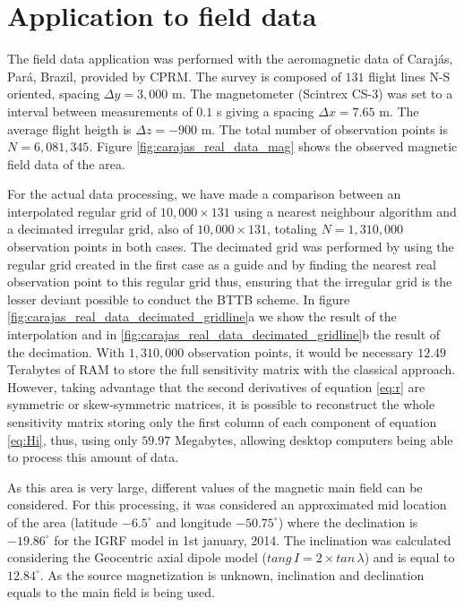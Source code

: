 \section{Application to field data}

The field data application was performed with the aeromagnetic data of Carajás, Pará, Brazil, provided by CPRM.
The survey is composed of $131$ flight lines N-S oriented, spacing $\Delta y = 3,000$ m. The magnetometer (Scintrex CS-3) was set to a interval between measurements of $0.1$ s giving a spacing $\Delta x = 7.65$ m. The average flight heigth is $\Delta z = -900$ m. The total number of observation points is $N = 6,081,345$. Figure \ref{fig:carajas_real_data_mag} shows the observed magnetic field data of the area.

For the actual data processing, we have made a comparison between an interpolated regular grid of $10,000 \times 131$ using a nearest neighbour algorithm and a decimated irregular grid, also of $10,000 \times 131$, totaling $N = 1,310,000$ observation points in both cases. The decimated grid was performed by using the regular grid created in the first case as a guide and by finding the nearest real observation point to this regular grid thus, ensuring that the irregular grid is the lesser deviant possible to conduct the BTTB scheme. In figure \ref{fig:carajas_real_data_decimated_gridline}a we show the result of the interpolation and in \ref{fig:carajas_real_data_decimated_gridline}b the result of the decimation. With $1,310,000$ observation points, it would be necessary $12.49$ Terabytes of RAM to store the full sensitivity matrix with the classical approach. However, taking advantage that the second derivatives of equation \ref{eq:r} are symmetric or skew-symmetric matrices, it is possible to reconstruct the whole sensitivity matrix storing only the first column of each component of equation \ref{eq:Hi}, thus, using only $59.97$ Megabytes, allowing desktop computers being able to process this amount of data.

As this area is very large, different values of the magnetic main field can be considered. 
For this processing, it was considered an approximated mid location of the area (latitude $-6.5^{\circ}$ and longitude $-50.75^{\circ}$) where the declination is $-19.86^{\circ}$ for the IGRF model in 1st january, 2014. The inclination was calculated considering the Geocentric axial dipole model ($tang \, I = 2 \times tan \, \lambda$) and is equal to $12.84^{\circ}$. As the source magnetization is unknown, inclination and declination equals to the main field is being used.

